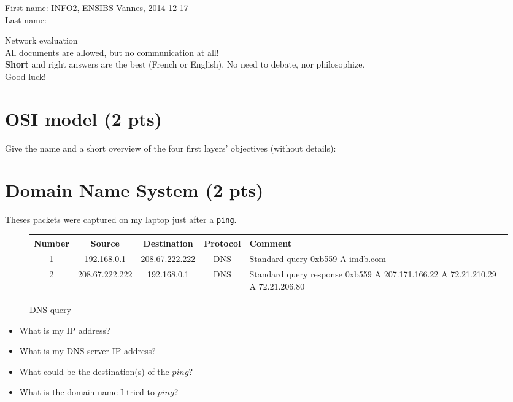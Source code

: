 \documentclass[11pt]{article}
\begin{document}
\noindent First name: \hfill INFO2, ENSIBS Vannes, 2014-12-17\\
Last name:
\begin{center}
	{\LARGE{Network evaluation}} \\
	All documents are allowed, but no communication at all!\\
	\textbf{Short} and right answers are the best (French or English). No need to debate, nor philosophize.\\
	Good luck!
\end{center}
\vspace{-22pt}
\section{OSI model (2 pts)}\vspace{-11pt}
Give the name and a short overview of the four first layers' objectives (without details):
\vspace{7cm}
\section{Domain Name System (2 pts)}\vspace{-11pt}
Theses packets were captured on my laptop just after a \verb_ping_.
\begin{figure}[h!]
	\begin{tabular}{c|cc|c|p{8cm}}
		\textbf{Number} & \textbf{Source} & \textbf{Destination} & \textbf{Protocol} & \textbf{Comment} \\ \hline
		1 & 192.168.0.1 & 208.67.222.222 & DNS & Standard query 0xb559  A imdb.com \\
		2 &	208.67.222.222 & 192.168.0.1 & DNS & Standard query response 0xb559 A 207.171.166.22 A 72.21.210.29 A 72.21.206.80 
	\end{tabular}
	\caption{DNS query}
\end{figure}
\vspace{-22pt}
\begin{itemize}
	\item What is my IP address?
	\item What is my DNS server IP address?
	\item What could be the destination(s) of the $ping$?
	\item What is the domain name I tried to $ping$?
\end{itemize}
\end{document}
